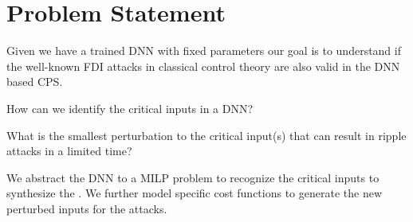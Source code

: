 \section{Problem Statement}

Given we have a trained DNN with fixed parameters our goal is to understand if the well-known FDI attacks in classical control theory are also valid in the DNN based CPS.
\begin{problem}
	How can we identify the critical inputs in a DNN?
\end{problem}


\begin{problem}
	What is the smallest perturbation to the critical input(s) that can result in ripple attacks in a limited time?
\end{problem}

\begin{approach*}
	We abstract the DNN to a MILP problem to recognize the critical inputs to synthesize the \attack. We further model \attack specific cost functions to generate the new perturbed inputs for the attacks. 
\end{approach*}
